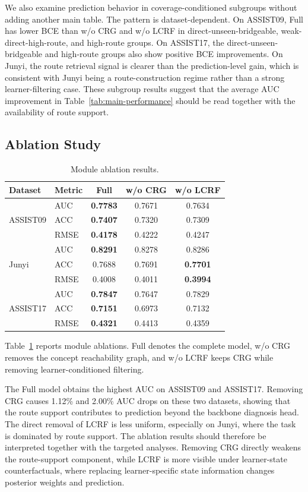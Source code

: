 \documentclass[conference]{IEEEtran}
\begin{document}
We also examine prediction behavior in coverage-conditioned subgroups without adding another main table. The pattern is dataset-dependent. On ASSIST09, Full has lower BCE than w/o CRG and w/o LCRF in direct-unseen-bridgeable, weak-direct-high-route, and high-route groups. On ASSIST17, the direct-unseen-bridgeable and high-route groups also show positive BCE improvements. On Junyi, the route retrieval signal is clearer than the prediction-level gain, which is consistent with Junyi being a route-construction regime rather than a strong learner-filtering case. These subgroup results suggest that the average AUC improvement in Table~\ref{tab:main-performance} should be read together with the availability of route support.

\subsection{Ablation Study}
\begin{table}[H]
\centering
\caption{Module ablation results.}
\label{tab:ablation}
\small
\setlength{\tabcolsep}{3.2pt}
\begin{tabular}{llccc}
\toprule
Dataset & Metric & Full & w/o CRG & w/o LCRF\\
\midrule
\multirow{3}{*}{ASSIST09}
& AUC  & \textbf{0.7783} & 0.7671 & 0.7634\\
& ACC  & \textbf{0.7407} & 0.7320 & 0.7309\\
& RMSE & \textbf{0.4178} & 0.4222 & 0.4247\\
\midrule
\multirow{3}{*}{Junyi}
& AUC  & \textbf{0.8291} & 0.8278 & 0.8286\\
& ACC  & 0.7688 & 0.7691 & \textbf{0.7701}\\
& RMSE & 0.4008 & 0.4011 & \textbf{0.3994}\\
\midrule
\multirow{3}{*}{ASSIST17}
& AUC  & \textbf{0.7847} & 0.7647 & 0.7829\\
& ACC  & \textbf{0.7151} & 0.6973 & 0.7132\\
& RMSE & \textbf{0.4321} & 0.4413 & 0.4359\\
\bottomrule
\end{tabular}
\end{table}

Table~\ref{tab:ablation} reports module ablations. Full denotes the complete model, w/o CRG removes the concept reachability graph, and w/o LCRF keeps CRG while removing learner-conditioned filtering.

The Full model obtains the highest AUC on ASSIST09 and ASSIST17. Removing CRG causes 1.12\% and 2.00\% AUC drops on these two datasets, showing that the route support contributes to prediction beyond the backbone diagnosis head. The direct removal of LCRF is less uniform, especially on Junyi, where the task is dominated by route support. The ablation results should therefore be interpreted together with the targeted analyses. Removing CRG directly weakens the route-support component, while LCRF is more visible under learner-state counterfactuals, where replacing learner-specific state information changes posterior weights and prediction.
\end{document}
